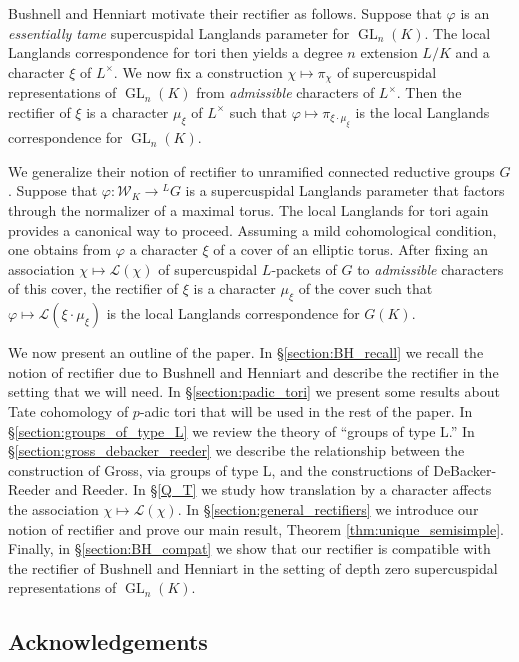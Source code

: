 \documentclass{compositio}
\theoremstyle{plain}
\theoremstyle{definition}
\DeclareMathOperator{\GL}{GL}
\newcommand{\Weil}{\mathcal{W}}
\newcommand{\Lpack}{\mathcal{L}}
\begin{document}
Bushnell and Henniart motivate their rectifier as follows.
Suppose that $\varphi$ is an \emph{essentially tame} supercuspidal Langlands parameter for
$\GL_n(K)$.  The local Langlands correspondence for tori then yields a degree $n$ extension
$L/K$ and a character $\xi$ of $L^{\times}$.  We now fix a construction $\chi \mapsto \pi_{\chi}$
of supercuspidal representations of $\GL_n(K)$ from \emph{admissible} characters of $L^{\times}$.
Then the rectifier of $\xi$ is a character $\mu_{\xi}$ of $L^{\times}$ such that
$\varphi \mapsto \pi_{\xi \cdot \mu_{\xi}}$ is the local Langlands correspondence for $\GL_n(K)$.

We generalize their notion of rectifier to unramified connected reductive groups $G$.
Suppose that $\varphi : \Weil_K \rightarrow {}^L G$ is a supercuspidal Langlands parameter
that factors through the normalizer of a maximal torus.
The local Langlands for tori again provides a canonical way to proceed.  Assuming a mild
cohomological condition, one
obtains from $\varphi$ a character $\xi$ of a cover of an elliptic torus.
After fixing an association $\chi \mapsto \Lpack(\chi)$ of supercuspidal $L$-packets of $G$
to \emph{admissible} characters of this cover, the rectifier of $\xi$ is a character
$\mu_{\xi}$ of the cover such that $\varphi \mapsto \Lpack(\xi \cdot \mu_{\xi})$
is the local Langlands correspondence for $G(K)$.

We now present an outline of the paper.  In \S\ref{section:BH_recall} we recall
the notion of rectifier due to Bushnell and Henniart and describe
the rectifier in the setting that we will need.  In \S\ref{section:padic_tori}
we present some results about Tate cohomology of $p$-adic tori that will be used
in the rest of the paper.  In \S\ref{section:groups_of_type_L} we review
the theory of ``groups of type L.''  In
\S\ref{section:gross_debacker_reeder} we describe the relationship between the
construction of Gross, via groups of type L, and the constructions of
DeBacker-Reeder and Reeder.  In \S\ref{Q_T} we study how translation by a character affects
the association $\chi \mapsto \Lpack(\chi)$.
In \S\ref{section:general_rectifiers} we
introduce our notion of rectifier and prove our main result, Theorem \ref{thm:unique_semisimple}.
Finally, in \S\ref{section:BH_compat} we show that our rectifier is compatible with
the rectifier of Bushnell and Henniart in the setting of depth zero
supercuspidal representations of $\GL_n(K)$.

\subsection*{Acknowledgements}
\end{document}
